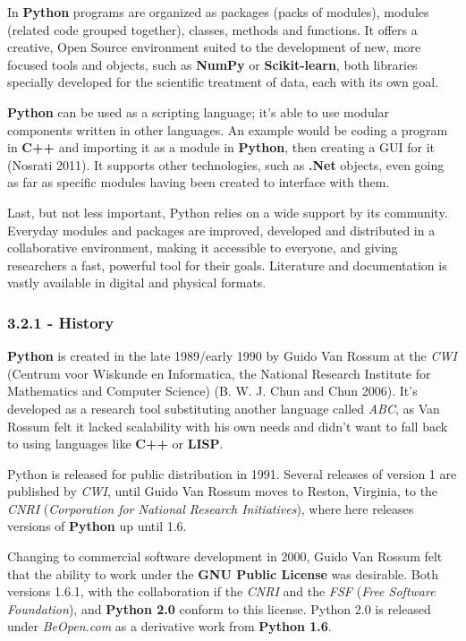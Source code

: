 \documentclass[]{article}
\begin{document}
In \textbf{Python} programs are organized as packages (packs of
modules), modules (related code grouped together), classes, methods and
functions. It offers a creative, Open Source environment suited to the
development of new, more focused tools and objects, such as
\textbf{NumPy} or \textbf{Scikit-learn}, both libraries specially
developed for the scientific treatment of data, each with its own goal.

\textbf{Python} can be used as a scripting language; it's able to use
modular components written in other languages. An example would be
coding a program in \textbf{C++} and importing it as a module in
\textbf{Python}, then creating a GUI for it (Nosrati 2011). It supports
other technologies, such as \textbf{.Net} objects, even going as far as
specific modules having been created to interface with them.

Last, but not less important, Python relies on a wide support by its
community. Everyday modules and packages are improved, developed and
distributed in a collaborative environment, making it accessible to
everyone, and giving researchers a fast, powerful tool for their goals.
Literature and documentation is vastly available in digital and physical
formats.

\subsubsection{3.2.1 - History}\label{history}

\textbf{Python} is created in the late 1989/early 1990 by Guido Van
Rossum at the \emph{CWI} (Centrum voor Wiskunde en Informatica, the
National Research Institute for Mathematics and Computer Science) (B. W.
J. Chun and Chun 2006). It's developed as a research tool substituting
another language called \emph{ABC}, as Van Rossum felt it lacked
scalability with his own needs and didn't want to fall back to using
languages like \textbf{C++} or \textbf{LISP}.

Python is released for public distribution in 1991. Several releases of
version 1 are published by \emph{CWI}, until Guido Van Rossum moves to
Reston, Virginia, to the \emph{CNRI} (\emph{Corporation for National
Research Initiatives}), where here releases versions of \textbf{Python}
up until 1.6.

Changing to commercial software development in 2000, Guido Van Rossum
felt that the ability to work under the \textbf{GNU Public License} was
desirable. Both versions 1.6.1, with the collaboration if the
\emph{CNRI} and the \emph{FSF} (\emph{Free Software Foundation}), and
\textbf{Python 2.0} conform to this license. Python 2.0 is released
under \emph{BeOpen.com} as a derivative work from \textbf{Python 1.6}.
\end{document}
